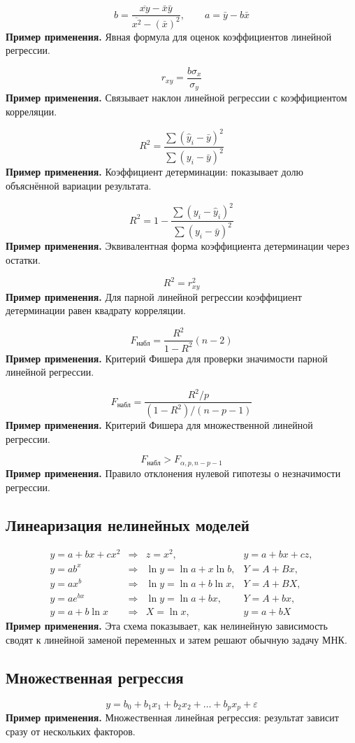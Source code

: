 \documentclass[a4paper,14pt]{extarticle}
\newcommand{\FormulaNote}[2]{%
  \begin{equation*}
  #1
  \end{equation*}
  \noindent\textbf{Пример применения.} #2\par\medskip
}
\begin{document}
\FormulaNote{b=\frac{\overline{xy}-\bar{x}\bar{y}}{\overline{x^2}-(\bar{x})^2},\qquad a=\bar{y}-b\bar{x}}{Явная формула для оценок коэффициентов линейной регрессии.}

\FormulaNote{r_{xy}=\frac{b\sigma_x}{\sigma_y}}{Связывает наклон линейной регрессии с коэффициентом корреляции.}

\FormulaNote{R^2=\frac{\sum(\hat{y}_i-\bar{y})^2}{\sum(y_i-\bar{y})^2}}{Коэффициент детерминации: показывает долю объяснённой вариации результата.}

\FormulaNote{R^2=1-\frac{\sum(y_i-\hat{y}_i)^2}{\sum(y_i-\bar{y})^2}}{Эквивалентная форма коэффициента детерминации через остатки.}

\FormulaNote{R^2=r_{xy}^2}{Для парной линейной регрессии коэффициент детерминации равен квадрату корреляции.}

\FormulaNote{F_{\text{набл}}=\frac{R^2}{1-R^2}(n-2)}{Критерий Фишера для проверки значимости парной линейной регрессии.}

\FormulaNote{F_{\text{набл}}=\frac{R^2/p}{(1-R^2)/(n-p-1)}}{Критерий Фишера для множественной линейной регрессии.}

\FormulaNote{F_{\text{набл}}>F_{\alpha,p,n-p-1}}{Правило отклонения нулевой гипотезы о незначимости регрессии.}

\subsection{Линеаризация нелинейных моделей}

\FormulaNote{
\begin{array}{lcll}
y=a+bx+cx^2 &\Rightarrow& z=x^2, & y=a+bx+cz,\\[0.5ex]
y=ab^x      &\Rightarrow& \ln y=\ln a+x\ln b, & Y=A+Bx,\\[0.5ex]
y=ax^b      &\Rightarrow& \ln y=\ln a+b\ln x, & Y=A+BX,\\[0.5ex]
y=ae^{bx}   &\Rightarrow& \ln y=\ln a+bx, & Y=A+bx,\\[0.5ex]
y=a+b\ln x  &\Rightarrow& X=\ln x, & y=a+bX
\end{array}
}{Эта схема показывает, как нелинейную зависимость сводят к линейной заменой переменных и затем решают обычную задачу МНК.}

\subsection{Множественная регрессия}

\FormulaNote{y=b_0+b_1x_1+b_2x_2+\dots+b_px_p+\varepsilon}{Множественная линейная регрессия: результат зависит сразу от нескольких факторов.}
\end{document}
